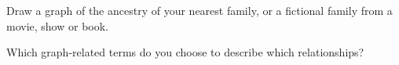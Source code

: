 Draw a graph of the ancestry of your nearest family, or a fictional family from a movie, show or book.

Which graph-related terms do you choose to describe which relationships?
